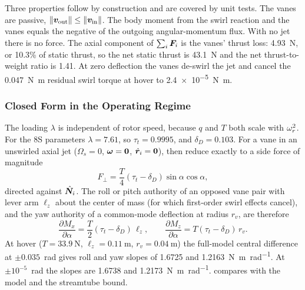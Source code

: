 \documentclass[10pt,letterpaper]{article}
\begin{document}
Three properties follow by construction and are covered by unit tests.
The vanes are passive, $\|\bm{v}_{\text{out}}\| \le \|\bm{v}_{\text{in}}\|$.
The body moment from the swirl reaction and the vanes equals the negative of the outgoing angular-momentum flux.
With no jet there is no force.
The axial component of $\sum_i\bm{F}_i$ is the vanes' thrust loss: \SI{4.93}{\newton}, or 10.3\% of static thrust, so the net static thrust is \SI{43.1}{\newton} and the net thrust-to-weight ratio is 1.41.
At zero deflection the vanes de-swirl the jet and cancel the \SI{0.047}{\newton\metre} residual swirl torque at hover to \SI{2.4e-5}{\newton\metre}.

\subsubsection{Closed Form in the Operating Regime}
\label{sec:closedform}

The loading $\lambda$ is independent of rotor speed, because $q$ and $T$ both scale with $\omega_r^2$.
For the 8S parameters $\lambda = 7.61$, so $\tau_t = 0.9995$, and $\delta_D = 0.103$.
For a vane in an unswirled axial jet ($\Omega_s = 0$, $\bm{\omega} = \bm{0}$, $\dot{\bm{r}}_i = \bm{0}$),  then reduce exactly to a side force of magnitude
\begin{equation}
F_{\perp} = \frac{T}{4}\left(\tau_t - \delta_D\right)\sin\alpha\cos\alpha ,
\label{eq:closed}
\end{equation}
directed against $\hat{\bm{N}}_i$.
The roll or pitch authority of an opposed vane pair with lever arm $\ell_z$ about the center of mass (for which first-order swirl effects cancel), and the yaw authority of a common-mode deflection at radius $r_v$, are therefore
\begin{equation}
\frac{\partial M_x}{\partial \alpha} = \frac{T}{2}(\tau_t - \delta_D)\,\ell_z, \qquad
\frac{\partial M_z}{\partial \alpha} = T(\tau_t - \delta_D)\,r_v .
\label{eq:authority}
\end{equation}
At hover ($T=\SI{33.9}{\newton}$, $\ell_z=\SI{0.11}{\metre}$, $r_v=\SI{0.04}{\metre}$) the full-model central difference at $\pm0.035$~rad gives roll and yaw slopes of 1.6725 and \SI{1.2163}{\newton\metre\per\radian}. At $\pm10^{-5}$~rad the slopes are 1.6738 and \SI{1.2173}{\newton\metre\per\radian}.
 compares  with the model and the streamtube bound.
\end{document}
